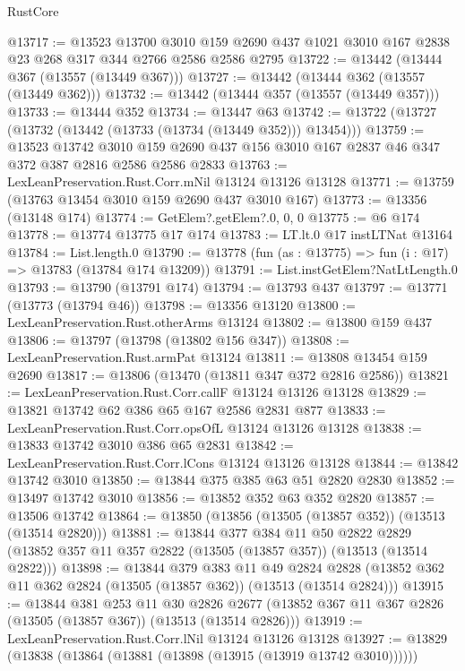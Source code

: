 \begin{lexlean}{RustCore}
\begin{coremodule}
@13717 := @13523
    @13700
    @3010
    @159
    @2690
    @437
    @1021
    @3010
    @167
    @2838
    @23
    @268
    @317
    @344
    @2766
    @2586
    @2586
    @2795
@13722 := @13442 (@13444 @367 (@13557 (@13449 @367)))
@13727 := @13442 (@13444 @362 (@13557 (@13449 @362)))
@13732 := @13442 (@13444 @357 (@13557 (@13449 @357)))
@13733 := @13444 @352
@13734 := @13447 @63
@13742 := @13722 (@13727 (@13732 (@13442 (@13733 (@13734 (@13449 @352))) @13454)))
@13759 := @13523
    @13742
    @3010
    @159
    @2690
    @437
    @156
    @3010
    @167
    @2837
    @46
    @347
    @372
    @387
    @2816
    @2586
    @2586
    @2833
@13763 := LexLeanPreservation.Rust.Corr.mNil @13124 @13126 @13128
@13771 := @13759 (@13763 @13454 @3010 @159 @2690 @437 @3010 @167)
@13773 := @13356 (@13148 @174)
@13774 := GetElem?.getElem?.{0, 0, 0}
@13775 := @6 @174
@13778 := @13774 @13775 @17 @174
@13783 := LT.lt.{0} @17 instLTNat @13164
@13784 := List.length.{0}
@13790 := @13778 (fun (as : @13775) => fun (i : @17) => @13783 (@13784 @174 @13209))
@13791 := List.instGetElem?NatLtLength.{0}
@13793 := @13790 (@13791 @174)
@13794 := @13793 @437
@13797 := @13771 (@13773 (@13794 @46))
@13798 := @13356 @13120
@13800 := LexLeanPreservation.Rust.otherArms @13124
@13802 := @13800 @159 @437
@13806 := @13797 (@13798 (@13802 @156 @347))
@13808 := LexLeanPreservation.Rust.armPat @13124
@13811 := @13808 @13454 @159 @2690
@13817 := @13806 (@13470 (@13811 @347 @372 @2816 @2586))
@13821 := LexLeanPreservation.Rust.Corr.callF @13124 @13126 @13128
@13829 := @13821 @13742 @62 @386 @65 @167 @2586 @2831 @877
@13833 := LexLeanPreservation.Rust.Corr.opsOfL @13124 @13126 @13128
@13838 := @13833 @13742 @3010 @386 @65 @2831
@13842 := LexLeanPreservation.Rust.Corr.lCons @13124 @13126 @13128
@13844 := @13842 @13742 @3010
@13850 := @13844 @375 @385 @63 @51 @2820 @2830
@13852 := @13497 @13742 @3010
@13856 := @13852 @352 @63 @352 @2820
@13857 := @13506 @13742
@13864 := @13850 (@13856 (@13505 (@13857 @352)) (@13513 (@13514 @2820)))
@13881 := @13844
    @377
    @384
    @11
    @50
    @2822
    @2829
    (@13852 @357 @11 @357 @2822 (@13505 (@13857 @357)) (@13513 (@13514 @2822)))
@13898 := @13844
    @379
    @383
    @11
    @49
    @2824
    @2828
    (@13852 @362 @11 @362 @2824 (@13505 (@13857 @362)) (@13513 (@13514 @2824)))
@13915 := @13844
    @381
    @253
    @11
    @30
    @2826
    @2677
    (@13852 @367 @11 @367 @2826 (@13505 (@13857 @367)) (@13513 (@13514 @2826)))
@13919 := LexLeanPreservation.Rust.Corr.lNil @13124 @13126 @13128
@13927 := @13829 (@13838 (@13864 (@13881 (@13898 (@13915 (@13919 @13742 @3010))))))

\end{coremodule}
\end{lexlean}
